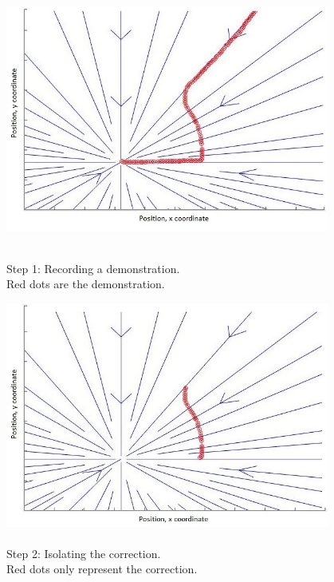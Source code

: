 \begin{figure}[H]
    \begin{minipage}[b]{0.5\linewidth}
        \centering
        \includegraphics[width=0.95\textwidth]{img/step_1_traj.jpg}
        \caption{\\\hspace{0cm}Step 1: Recording a demonstration.\\\hspace{0cm}Red dots are the demonstration.}
        \label{step1_process}
    \end{minipage}
    \begin{minipage}[b]{0.5\linewidth}
        \centering 
        \includegraphics[width=0.95\textwidth]{img/step_2_iso.jpg}
        \caption{\\\hspace{0cm}Step 2: Isolating the correction.\\\hspace{0cm}Red dots only represent the correction.}
        \label{step2_process}
    \end{minipage}\hfill
\end{figure}
